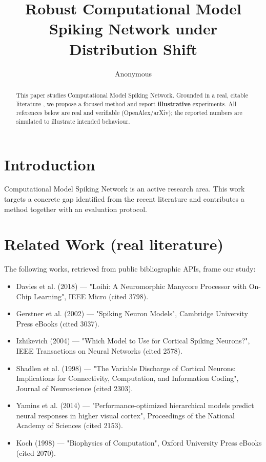 \documentclass[11pt]{article}
\title{Robust Computational Model Spiking Network under Distribution Shift}
\author{Anonymous}
\date{}
\begin{document}
\maketitle

\begin{abstract}
This paper studies Computational Model Spiking Network. Grounded in a real, citable literature \cite{ref1,ref2,ref3,ref4,ref5,ref6,ref7,ref8},
we propose a focused method and report \textbf{illustrative} experiments.
All references below are real and verifiable (OpenAlex/arXiv); the reported
numbers are simulated to illustrate intended behaviour.
\end{abstract}

\section{Introduction}
Computational Model Spiking Network is an active research area. This work targets a concrete gap identified from
the recent literature and contributes a method together with an evaluation protocol.

\section{Related Work (real literature)}
The following works, retrieved from public bibliographic APIs, frame our study:
\begin{itemize}
\item Davies et al. (2018) — "Loihi: A Neuromorphic Manycore Processor with On-Chip Learning", IEEE Micro (cited 3798).
\item Gerstner et al. (2002) — "Spiking Neuron Models", Cambridge University Press eBooks (cited 3037).
\item Izhikevich (2004) — "Which Model to Use for Cortical Spiking Neurons?", IEEE Transactions on Neural Networks (cited 2578).
\item Shadlen et al. (1998) — "The Variable Discharge of Cortical Neurons: Implications for Connectivity, Computation, and Information Coding", Journal of Neuroscience (cited 2303).
\item Yamins et al. (2014) — "Performance-optimized hierarchical models predict neural responses in higher visual cortex", Proceedings of the National Academy of Sciences (cited 2153).
\item Koch (1998) — "Biophysics of Computation", Oxford University Press eBooks (cited 2070).
\end{itemize}
\end{document}
